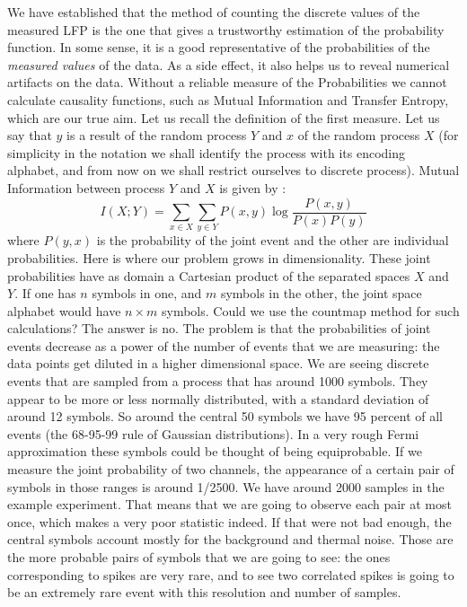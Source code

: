 \documentclass[10pt]{article}
\begin{document}
We have established that the method of counting the discrete values of
the measured LFP is the one that gives a trustworthy estimation of the
probability function. In some sense, it is a good representative
of the probabilities of the \emph{measured values} of the data.
As a side effect, it also helps us to reveal numerical artifacts
on the data. Without a reliable measure of the Probabilities
we cannot  calculate causality functions, such as Mutual Information and
Transfer Entropy, which are our true aim.
Let us recall the definition of the first measure. Let us say that
$y$ is a result of the random process $Y$ and $x$ of the random
process $X$ (for simplicity in the notation we shall identify
the process with its encoding alphabet, and from now on we shall
restrict ourselves to discrete process). Mutual Information
between process $Y$ and $X$ is given by \cite{Cover1991}:
\begin{equation}
  I(X;Y)=\sum_{x \in X} \sum_{y \in Y} P(x,y) \log \frac{P(x,y)}{P(x)P(y)}
\end{equation}
where $P(y,x)$ is the probability of the joint event and the other are
individual probabilities. Here is where our problem grows in dimensionality.
These joint probabilities have as domain a Cartesian product of the
separated spaces $X$ and $Y$. If one has $n$ symbols in one, and
$m$ symbols in the other, the joint space alphabet would have $ n \times m$ 
symbols.
Could we use the countmap method for such calculations?
The answer is no. The problem is that the probabilities of joint events
decrease as a power of the number of events that we are measuring: the data
points get diluted in a higher dimensional space. We are seeing
discrete events that are sampled from a process that has around 1000 symbols.
They appear to be more or less normally distributed, with a standard deviation
of around 12 symbols. So around the central 50 symbols we have 95 percent of all
events (the 68-95-99 rule of Gaussian distributions).
In a very rough Fermi approximation these symbols could be thought of being
equiprobable. If we measure the joint probability of two channels,
the appearance of a certain pair
of symbols in those ranges is around 1/2500. We have around 2000 samples in
the example experiment. That means that we are going to observe each pair
at most once, which makes a very poor statistic indeed.
If that were not bad enough,
the central symbols account mostly for the background and thermal noise.
Those are the more probable pairs of symbols that we are going to see: the
ones corresponding to spikes are very rare, and to see
two correlated spikes is going to be an extremely rare event with this
resolution and number of samples.
\end{document}
